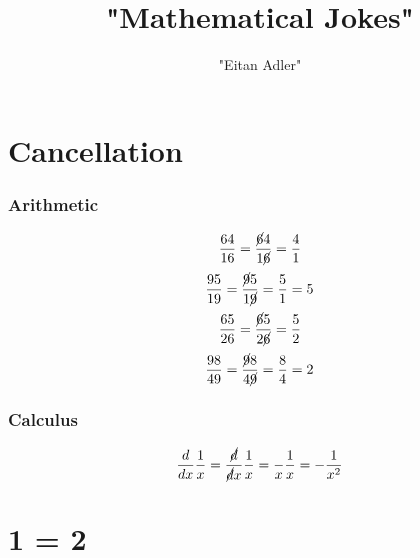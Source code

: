 \documentclass{article}
\title {"Mathematical Jokes"}
\author {"Eitan Adler"}
\begin{document}
\maketitle


\section{Cancellation}
\subsubsection{Arithmetic}
\begin{equation}
	\begin{split}
		\frac{64}{16}
		=
		\frac{\cancel{6}4}{1\cancel{6}}
		=
		\frac{4}{1}
	\end{split}
\end{equation}
\begin{equation}
	\begin{split}
		\frac{95}{19}
		=
		\frac{\cancel{9}5}{1\cancel{9}}
		=
		\frac{5}{1}
		=
		5
	\end{split}
\end{equation}
\begin{equation}
	\begin{split}
		\frac{65}{26}
		=
		\frac{\cancel{6}5}{2\cancel{6}}
		=
		\frac{5}{2}
	\end{split}
\end{equation}
\begin{equation}
	\begin{split}
		\frac{98}{49}
		=
		\frac{\cancel{9}8}{4\cancel{9}}
		=
		\frac{8}{4}
		=
		2
	\end{split}
\end{equation}

\subsubsection{Calculus}
\begin{equation}
	\begin{split}
		\frac{d}{dx}
		\frac{1}{x}
		=
		\frac{\cancel{d}}{\cancel{d}x}
		\frac{1}{x}
		=
		\frac{}{x}
		\frac{1}{x}
		=
		- \frac{1}{x^2}
	\end{split}
\end{equation}

\section{1 = 2}
\end{document}
